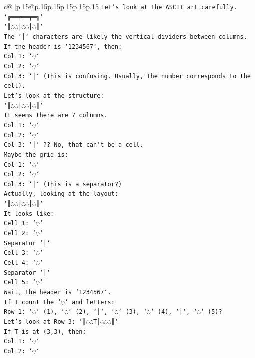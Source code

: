 \documentclass{article}
\begin{document}
{\begin{supertabular}{c@{$\;$}|p{.15\linewidth}@{}p{.15\linewidth}p{.15\linewidth}p{.15\linewidth}p{.15\linewidth}p{.15\linewidth}}
{{{\texttt{Let's look at the ASCII art carefully.} \\
\texttt{`╔══╤══╤═╗`} \\
\texttt{`║◌◌│◌◌│◌║`} \\
\texttt{The `│` characters are likely the vertical dividers between columns.} \\
\texttt{If the header is `1234567`, then:} \\
\texttt{Col 1: `◌`} \\
\texttt{Col 2: `◌`} \\
\texttt{Col 3: `│` (This is confusing. Usually, the number corresponds to the cell).} \\
\texttt{Let's look at the structure:} \\
\texttt{`║◌◌│◌◌│◌║`} \\
\texttt{It seems there are 7 columns.} \\
\texttt{Col 1: `◌`} \\
\texttt{Col 2: `◌`} \\
\texttt{Col 3: `│` ?? No, that can't be a cell.} \\
\texttt{Maybe the grid is:} \\
\texttt{Col 1: `◌`} \\
\texttt{Col 2: `◌`} \\
\texttt{Col 3: `│` (This is a separator?)} \\
\texttt{Actually, looking at the layout:} \\
\texttt{`║◌◌│◌◌│◌║`} \\
\texttt{It looks like:} \\
\texttt{Cell 1: `◌`} \\
\texttt{Cell 2: `◌`} \\
\texttt{Separator `│`} \\
\texttt{Cell 3: `◌`} \\
\texttt{Cell 4: `◌`} \\
\texttt{Separator `│`} \\
\texttt{Cell 5: `◌`} \\
\texttt{Wait, the header is `1234567`.} \\
\texttt{If I count the `◌` and letters:} \\
\texttt{Row 1: `◌` (1), `◌` (2), `│`, `◌` (3), `◌` (4), `│`, `◌` (5)?} \\
\texttt{Let's look at Row 3: `║◌◌T│◌◌◌║`} \\
\texttt{If T is at (3,3), then:} \\
\texttt{Col 1: `◌`} \\
\texttt{Col 2: `◌`} \\
}}}
\end{supertabular}}
\end{document}
